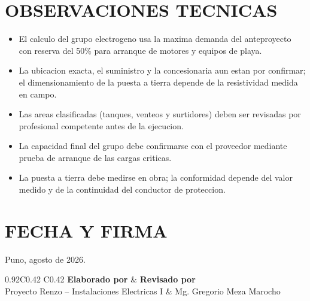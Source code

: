 \documentclass[12pt,letterpaper]{report}
\begin{document}
\section{OBSERVACIONES TECNICAS}

\begin{itemize}
  \item El calculo del grupo electrogeno usa la maxima demanda del anteproyecto con reserva del 50\% para arranque de motores y equipos de playa.
  \item La ubicacion exacta, el suministro y la concesionaria aun estan por confirmar; el dimensionamiento de la puesta a tierra depende de la resistividad medida en campo.
  \item Las areas clasificadas (tanques, venteos y surtidores) deben ser revisadas por profesional competente antes de la ejecucion.
  \item La capacidad final del grupo debe confirmarse con el proveedor mediante prueba de arranque de las cargas criticas.
  \item La puesta a tierra debe medirse en obra; la conformidad depende del valor medido y de la continuidad del conductor de proteccion.
\end{itemize}

\section{FECHA Y FIRMA}

Puno, agosto de 2026.

\vspace{0.45in}
\begin{table}[H]
\centering
\renewcommand{\arraystretch}{1.35}
\begin{tabularx}{0.92\textwidth}{C{0.42\textwidth} C{0.42\textwidth}}
\toprule
\textbf{Elaborado por} & \textbf{Revisado por} \\
\midrule
\vspace{0.42in} Proyecto Renzo -- Instalaciones Electricas I & \vspace{0.42in} Mg. Gregorio Meza Marocho \\
\bottomrule
\end{tabularx}
\end{table}
\end{document}
